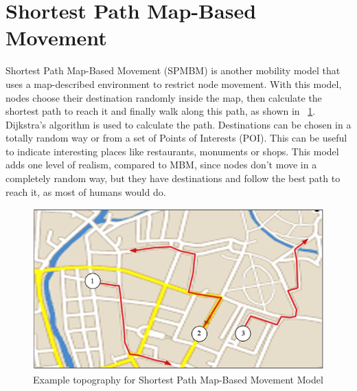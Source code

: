 \section{Shortest Path Map-Based Movement}
Shortest Path Map-Based Movement (SPMBM) is another mobility model that uses a map-described environment to restrict node movement. With this model, nodes choose their destination randomly inside the map, then calculate the shortest path to reach it and finally walk along this path, as shown in \figurename~\ref{fig:waypoint_map}. Dijkstra's algorithm is used to calculate the path. Destinations can be chosen in a totally random way or from a set of Points of Interests (POI). This can be useful to indicate interesting places like restaurants, monuments or shops. This model adds one level of realism, compared to MBM, since nodes don't move in a completely random way, but they have destinations and follow the best path to reach it, as most of humans would do.
\begin{figure}[htpb]
  \begin{center}
    \includegraphics[scale=0.6]{4-movimento/img/waypoint_map.png}
    \caption{Example topography for Shortest Path Map-Based Movement Model}    
    \label{fig:waypoint_map}
  \end{center}
\end{figure}

